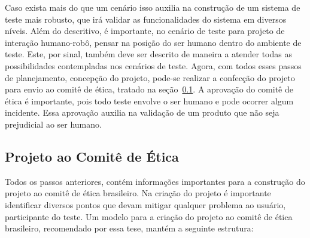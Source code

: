 Caso exista mais do que um cenário isso auxilia na construção de um sistema de teste mais robusto, que irá validar as funcionalidades do sistema em diversos níveis. Além do descritivo, é importante, no cenário de teste para projeto de interação humano-robô, pensar na posição do ser humano dentro do ambiente de teste. Este, por sinal, também deve ser descrito de maneira a atender todas as possibilidades contempladas nos cenários de teste. Agora, com todos esses passos de planejamento, concepção do projeto, pode-se realizar a confecção do projeto para envio ao comitê de ética, tratado na seção~\ref{sec:comiteetica}. A aprovação do comitê de ética é importante, pois todo teste envolve o ser humano e pode ocorrer algum incidente. Essa aprovação auxilia na validação de um produto que não seja prejudicial ao ser humano.

\subsection{Projeto ao Comitê de Ética}
\label{sec:comiteetica}
Todos os passos anteriores, contém informações importantes para a construção do projeto ao comitê de ética brasileiro. Na criação do projeto é importante identificar diversos pontos que devam mitigar qualquer problema ao usuário, participante do teste. Um modelo para a criação do projeto ao comitê de ética brasileiro, recomendado por essa tese, mantém a seguinte estrutura:

